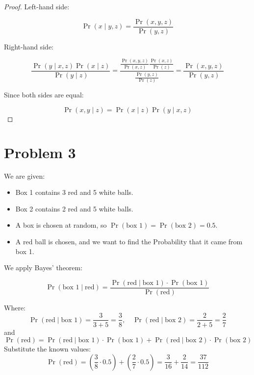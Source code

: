 \documentclass[12pt]{report}
\begin{document}
\begin{proof}

Left-hand side:

\begin{equation*}
\Pr(x \mid  y, z) = \frac{\Pr(x, y, z)}{\Pr(y,z)}
\end{equation*}

Right-hand side:

\begin{equation*}
\frac{\Pr(y \mid x, z) \Pr(x \mid z)}{\Pr(y \mid z)} = \frac{\frac{\Pr(x, y, z)}{\Pr(x,z)} \frac{\Pr(x, z)}{\Pr(z)}}{\frac{\Pr(y, z)}{\Pr(z)}} 
= \frac{\Pr(x, y, z)}{\Pr(y,z)}
\end{equation*}

Since both sides are equal:

\begin{equation*}
\Pr(x, y \mid z) = \Pr(x \mid z) \Pr(y \mid x, z)
\end{equation*}

\end{proof}


\section*{Problem 3}

We are given:

\begin{itemize}
    \item Box 1 contains 3 red and 5 white balls.
    \item Box 2 contains 2 red and 5 white balls.
    \item A box is chosen at random, so \( \Pr(\text{box 1}) = \Pr(\text{box 2}) = 0.5 \).
    \item A red ball is chosen, and we want to find the Probability that it came from box 1.
\end{itemize}

We apply Bayes' theorem:

\[
\Pr(\text{box 1} \mid \text{red}) = \frac{\Pr(\text{red} \mid \text{box 1}) \cdot \Pr(\text{box 1})}{\Pr(\text{red})}
\]

Where:
\[
\Pr(\text{red} \mid \text{box 1}) = \frac{3}{3+5} = \frac{3}{8}, \quad \Pr(\text{red} \mid \text{box 2}) = \frac{2}{2+5} = \frac{2}{7}
\]
and
\[
\Pr(\text{red}) = \Pr(\text{red} \mid \text{box 1}) \cdot \Pr(\text{box 1}) + \Pr(\text{red} \mid \text{box 2}) \cdot \Pr(\text{box 2})
\]
Substitute the known values:
\[
\Pr(\text{red}) = \left(\frac{3}{8} \cdot 0.5\right) + \left(\frac{2}{7} \cdot 0.5\right) = \frac{3}{16} + \frac{2}{14} = \frac{37}{112}
\]
\end{document}
